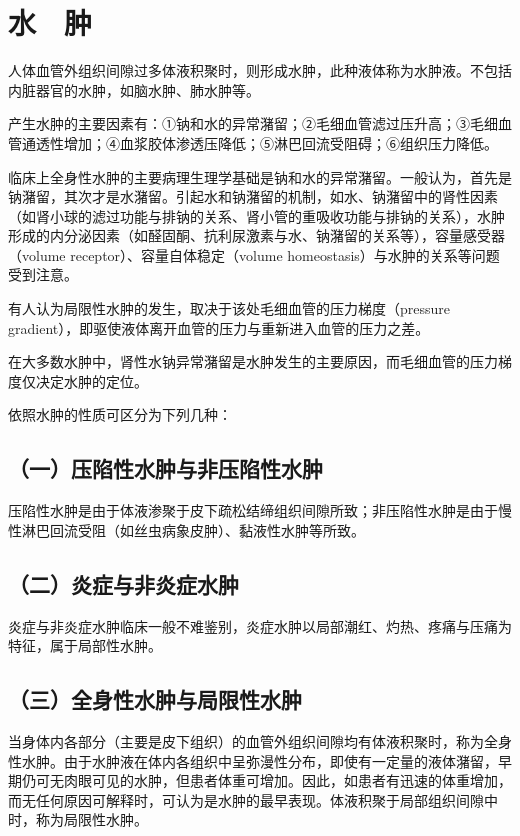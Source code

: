 \chapter{水　肿}

人体血管外组织间隙过多体液积聚时，则形成水肿，此种液体称为水肿液。不包括内脏器官的水肿，如脑水肿、肺水肿等。

产生水肿的主要因素有：①钠和水的异常潴留；②毛细血管滤过压升高；③毛细血管通透性增加；④血浆胶体渗透压降低；⑤淋巴回流受阻碍；⑥组织压力降低。

临床上全身性水肿的主要病理生理学基础是钠和水的异常潴留。一般认为，首先是钠潴留，其次才是水潴留。引起水和钠潴留的机制，如水、钠潴留中的肾性因素（如肾小球的滤过功能与排钠的关系、肾小管的重吸收功能与排钠的关系），水肿形成的内分泌因素（如醛固酮、抗利尿激素与水、钠潴留的关系等），容量感受器（volume
receptor）、容量自体稳定（volume
homeostasis）与水肿的关系等问题受到注意。

有人认为局限性水肿的发生，取决于该处毛细血管的压力梯度（pressure
gradient），即驱使液体离开血管的压力与重新进入血管的压力之差。

在大多数水肿中，肾性水钠异常潴留是水肿发生的主要原因，而毛细血管的压力梯度仅决定水肿的定位。

依照水肿的性质可区分为下列几种：

\section{（一）压陷性水肿与非压陷性水肿}

压陷性水肿是由于体液渗聚于皮下疏松结缔组织间隙所致；非压陷性水肿是由于慢性淋巴回流受阻（如丝虫病象皮肿）、黏液性水肿等所致。

\section{（二）炎症与非炎症水肿}

炎症与非炎症水肿临床一般不难鉴别，炎症水肿以局部潮红、灼热、疼痛与压痛为特征，属于局部性水肿。

\section{（三）全身性水肿与局限性水肿}

当身体内各部分（主要是皮下组织）的血管外组织间隙均有体液积聚时，称为全身性水肿。由于水肿液在体内各组织中呈弥漫性分布，即使有一定量的液体潴留，早期仍可无肉眼可见的水肿，但患者体重可增加。因此，如患者有迅速的体重增加，而无任何原因可解释时，可认为是水肿的最早表现。体液积聚于局部组织间隙中时，称为局限性水肿。

